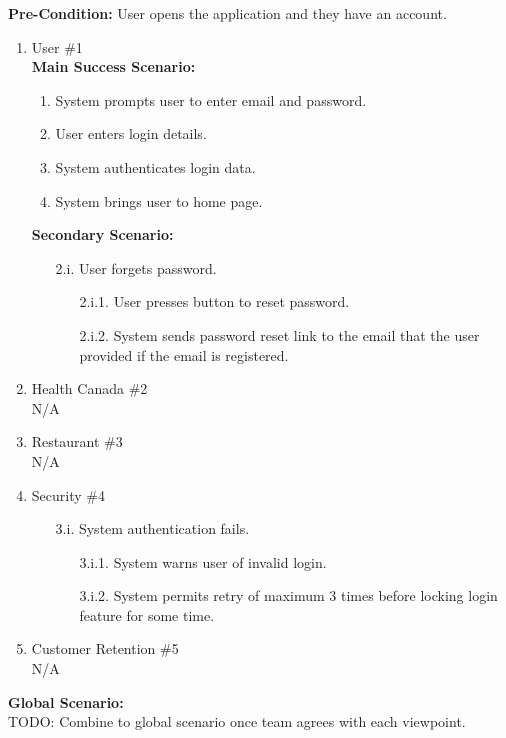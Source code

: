 \documentclass[]{article}
\begin{document}
\begin{enumerate}[{\bf BE1.}]
	\textbf{Pre-Condition:} User opens the application and they have an account.
		\begin{enumerate}[{\bf VP1.}]
			\item User \#1 \\
				\textbf{Main Success Scenario:} 
				\begin{enumerate}[{1.}]
					\item System prompts user to enter email and password.
					\item User enters login details.
					\item System authenticates login data.
					\item System brings user to home page.
				\end{enumerate}
				\textbf{Secondary Scenario:}
				\begin{enumerate}
					\item[2.i.] User forgets password.
					\begin{enumerate}
						\item[2.i.1.] User presses button to reset password.
						\item[2.i.2.] System sends password reset link to the email that the user provided if the email is registered.
					\end{enumerate}
				\end{enumerate}
			\item Health Canada  \#2 \\
				N/A
			\item Restaurant \#3 \\
				N/A
			\item Security \#4 
			\begin{enumerate}
				\item[3.i.] System authentication fails.
				\begin{enumerate}
					\item[3.i.1.] System warns user of invalid login.
					\item[3.i.2.] System permits retry of maximum 3 times before locking login feature for some time.
				\end{enumerate}
			\end{enumerate}
			\item Customer Retention \#5 \\
				N/A
		\end{enumerate}

		{\bf Global Scenario:} \\
		TODO: Combine to global scenario once team agrees with each viewpoint.


\end{enumerate}
\end{document}
